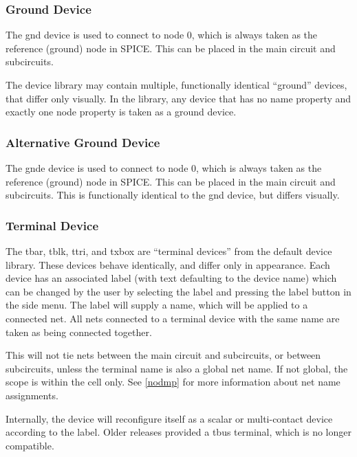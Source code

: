 \subsubsection{Ground Device}

The {\et gnd} device is used to connect to node 0, which is always
taken as the reference (ground) node in SPICE.  This can be placed in
the main circuit and subcircuits.

The device library may contain multiple, functionally identical
``ground'' devices, that differ only visually.  In the library, any
device that has no {\et name} property and exactly one {\et node}
property is taken as a ground device.

\subsubsection{Alternative Ground Device}

The {\et gnde} device is used to connect to node 0, which is always
taken as the reference (ground) node in SPICE.  This can be placed in
the main circuit and subcircuits.  This is functionally identical to
the {\et gnd} device, but differs visually.

\subsubsection{Terminal Device}
\label{devtbar}
The {\et tbar}, {\et tblk}, {\et ttri}, and {\et txbox} are ``terminal
devices'' from the default device library.  These devices behave
identically, and differ only in appearance.  Each device has an
associated label (with text defaulting to the device name) which can
be changed by the user by selecting the label and pressing the {\cb
label} button in the side menu.  The label will supply a name, which
will be applied to a connected net.  All nets connected to a terminal
device with the same name are taken as being connected together.

This will not tie nets between the main circuit and subcircuits, or
between subcircuits, unless the terminal name is also a global net
name.  If not global, the scope is within the cell only.  See
\ref{nodmp} for more information about net name assignments.

Internally, the device will reconfigure itself as a scalar or
multi-contact device according to the label.  Older {\Xic} releases
provided a {\et tbus} terminal, which is no longer compatible.

